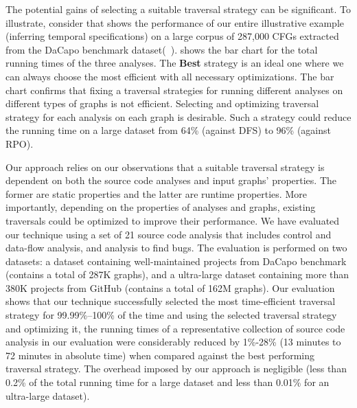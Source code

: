 The potential gains of selecting a suitable traversal strategy can be 
significant.
To illustrate, consider  that shows the performance of 
our entire illustrative example (inferring temporal specifications) on a 
large corpus of 287,000 CFGs extracted from the DaCapo
benchmark dataset(~\cite{blackburn2006dacapo}).
 shows the 
bar chart for the total running times of the three analyses. The \textbf{Best}
 strategy is an ideal one where we can always choose the most efficient with 
all necessary optimizations. The bar chart confirms that fixing a traversal 
strategies for running different analyses on different types of graphs is not 
efficient. Selecting and optimizing traversal strategy for each analysis on 
each graph is desirable. Such a strategy could reduce the running time on a 
large dataset from 64\% (against DFS) to 96\% (against RPO).

Our approach relies on our observations that a suitable traversal strategy is
dependent on both the source code analyses and input graphs' properties.
The former are static properties and the latter are runtime properties.
More importantly, depending on the properties of analyses and graphs, existing
traversals could be optimized to improve their performance.  
We have evaluated our technique using a set of 21 source code analysis that
includes control and data-flow analysis, and analysis to find bugs. The
evaluation is performed on two datasets: a dataset containing well-maintained
projects from DaCapo benchmark (contains a total of 287K graphs), and a
ultra-large dataset containing more than 380K projects from GitHub (contains a
total of 162M graphs). Our evaluation shows that our technique successfully selected
the most time-efficient traversal strategy for 99.99\%--100\% of the time and
using the selected traversal strategy and optimizing it, the running times of a
representative collection of source code analysis in our evaluation
were considerably reduced by 1\%-28\% (13 minutes to 72 minutes in absolute time) when compared against the best performing traversal strategy.
The overhead imposed by our approach is negligible (less than 0.2\% of the total 
running time for a large dataset and less than 0.01\% for an ultra-large dataset). 

